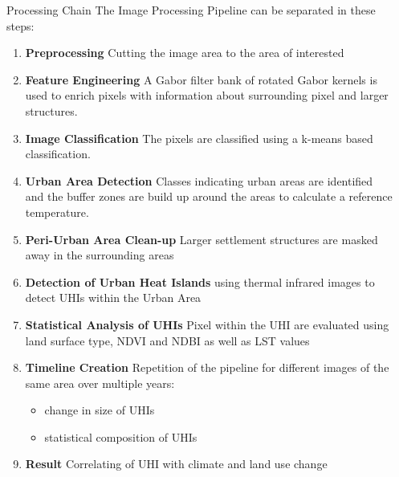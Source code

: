 \documentclass[final,20pt]{beamer}
\newlength{\sepwidth}
\newlength{\colwidth}
\newcommand{\separatorcolumn}{\begin{column}{\sepwidth}\end{column}}
\begin{document}
\begin{frame}[t]
\begin{columns}[t]
\begin{column}{\colwidth}
  \begin{block}{Processing Chain}
   The Image Processing Pipeline can be separated in these steps:
    \begin{enumerate}
      \setlength\itemsep{0.3em}
      \item \textbf{Preprocessing} Cutting the image area to the area of interested
      \item \textbf{Feature Engineering} A Gabor filter bank of rotated Gabor kernels is used to enrich pixels with information about surrounding pixel and larger structures.
      \item \textbf{Image Classification}  The pixels are classified using a k-means based classification. 
      \item \textbf{Urban Area Detection} Classes indicating urban areas are identified and the buffer zones are build up around the areas to calculate a reference temperature.
      \item \textbf{Peri-Urban Area Clean-up} Larger settlement structures are masked away in the surrounding areas
      \item \textbf{Detection of Urban Heat Islands} using thermal infrared images to detect UHIs within the Urban Area
      \item \textbf{Statistical Analysis of UHIs} Pixel within the UHI are evaluated using land surface type, NDVI and NDBI as well as LST values 
      \item \textbf{Timeline Creation} Repetition of the pipeline for different images of the same area over multiple years:
        \begin{itemize}
          \setlength\itemsep{0.5em}
          \item change in size of UHIs 
          \item statistical composition of UHIs 
        \end{itemize}
      \setlength\itemsep{0.5em}
      \item \textbf{Result} Correlating of UHI with climate and land use change 
    \end{enumerate}
  \end{block}

\end{column}

\separatorcolumn%


\end{columns}
\end{frame}
\end{document}
